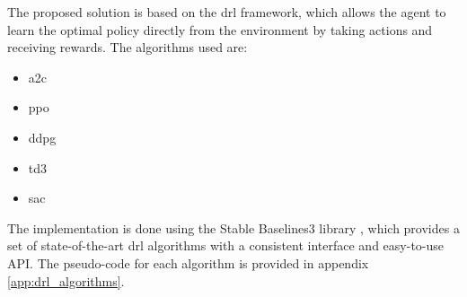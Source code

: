 The proposed solution is based on the \acrshort{drl} framework, which allows the agent to learn the optimal policy directly from the environment by taking actions and receiving rewards. The algorithms used are:
\begin{itemize}
    \item \acrfull{a2c}
    \item \acrfull{ppo}
    \item \acrfull{ddpg}
    \item \acrfull{td3}
    \item \acrfull{sac}
\end{itemize}

The implementation is done using the Stable Baselines3 library \cite{Raffin2021}, which provides a set of state-of-the-art \acrshort{drl} algorithms with a consistent interface and easy-to-use API. The pseudo-code for each algorithm is provided in appendix \ref{app:drl_algorithms}.
